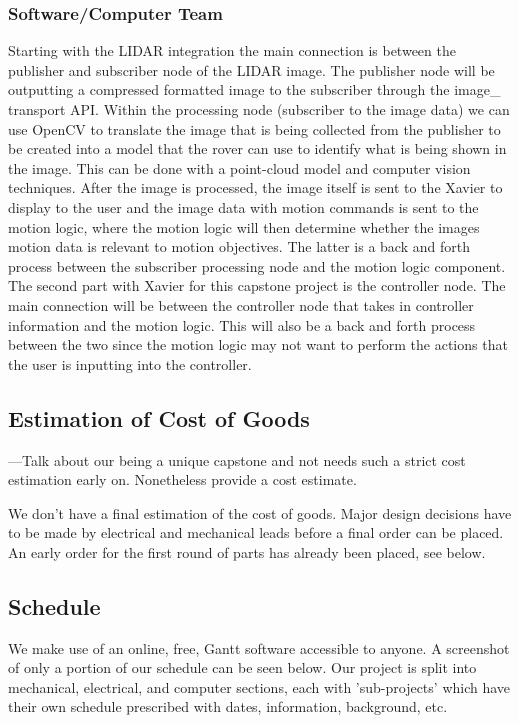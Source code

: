 \documentclass[a4paper, 10pt]{article}
\begin{document}
		\subsubsection{Software/Computer Team}
	
Starting with the LIDAR integration the main connection is between the publisher and subscriber node of the LIDAR image. The publisher node will be outputting a compressed formatted image to the subscriber through the image\_ transport API. Within the processing node (subscriber to the image data) we can use OpenCV to translate the image that is being collected from the publisher to be created into a model that the rover can use to identify what is being shown in the image. This can be done with a point-cloud model and computer vision techniques. After the image is processed, the image itself is sent to the Xavier to display to the user and the image data with motion commands is sent to the motion logic, where the motion logic will then determine whether the images motion data is relevant to motion objectives. The latter is a back and forth process between the subscriber processing node and the motion logic component. 
The second part with Xavier for this capstone project is the controller node. The main connection will be between the controller node that takes in controller information and the motion logic. This will also be a back and forth process between the two since the motion logic may not want to perform the actions that the user is inputting into the controller. 

	\subsection{Estimation of Cost of Goods}
	---Talk about our being a unique capstone and not  needs such a strict cost estimation early on. Nonetheless provide a cost estimate.
	
	We don't have a final estimation of the cost of goods. Major design decisions have to be made by electrical and mechanical leads before a final order can be placed. An early order for the first round of parts has already been placed, see below. 

	\subsection{Schedule}
	We make use of an online, free, Gantt software accessible to anyone. A screenshot of only a portion of our schedule can be seen below. Our project is split into mechanical, electrical, and computer sections, each with 'sub-projects' which have their own schedule prescribed with dates, information, background, etc.
\end{document}
